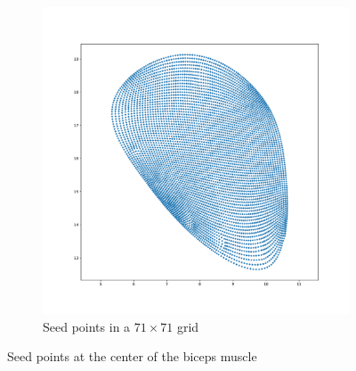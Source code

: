 \begin{figure}[H]
\begin{subfigure}[t]{0.48\textwidth}
    \includegraphics[width=\textwidth]{images/parallel_fiber_estimation/left_biceps_brachii_71x71fibers_bin_csv.pdf} %
    \caption{Seed points in a $71\times 71$ grid}%
    \label{fig:2_fibers}%
  \end{subfigure}   
  \caption{Seed points at the center of the biceps muscle}%
  \label{fig:multidomain_fibers}%
\end{figure}%

